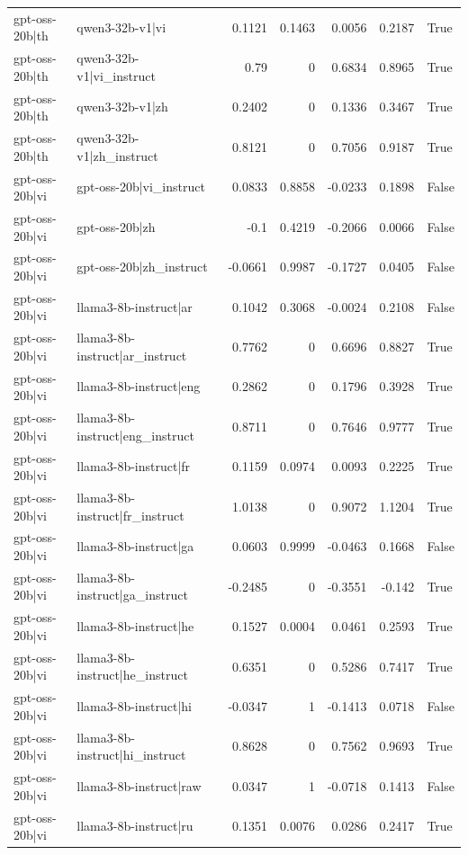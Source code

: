 \begin{table}
\begin{tabular}{l l r r r r l}
gpt-oss-20b|th & qwen3-32b-v1|vi & 0.1121 & 0.1463 & 0.0056 & 0.2187 & True \\
gpt-oss-20b|th & qwen3-32b-v1|vi_instruct & 0.79 & 0 & 0.6834 & 0.8965 & True \\
gpt-oss-20b|th & qwen3-32b-v1|zh & 0.2402 & 0 & 0.1336 & 0.3467 & True \\
gpt-oss-20b|th & qwen3-32b-v1|zh_instruct & 0.8121 & 0 & 0.7056 & 0.9187 & True \\
gpt-oss-20b|vi & gpt-oss-20b|vi_instruct & 0.0833 & 0.8858 & -0.0233 & 0.1898 & False \\
gpt-oss-20b|vi & gpt-oss-20b|zh & -0.1 & 0.4219 & -0.2066 & 0.0066 & False \\
gpt-oss-20b|vi & gpt-oss-20b|zh_instruct & -0.0661 & 0.9987 & -0.1727 & 0.0405 & False \\
gpt-oss-20b|vi & llama3-8b-instruct|ar & 0.1042 & 0.3068 & -0.0024 & 0.2108 & False \\
gpt-oss-20b|vi & llama3-8b-instruct|ar_instruct & 0.7762 & 0 & 0.6696 & 0.8827 & True \\
gpt-oss-20b|vi & llama3-8b-instruct|eng & 0.2862 & 0 & 0.1796 & 0.3928 & True \\
gpt-oss-20b|vi & llama3-8b-instruct|eng_instruct & 0.8711 & 0 & 0.7646 & 0.9777 & True \\
gpt-oss-20b|vi & llama3-8b-instruct|fr & 0.1159 & 0.0974 & 0.0093 & 0.2225 & True \\
gpt-oss-20b|vi & llama3-8b-instruct|fr_instruct & 1.0138 & 0 & 0.9072 & 1.1204 & True \\
gpt-oss-20b|vi & llama3-8b-instruct|ga & 0.0603 & 0.9999 & -0.0463 & 0.1668 & False \\
gpt-oss-20b|vi & llama3-8b-instruct|ga_instruct & -0.2485 & 0 & -0.3551 & -0.142 & True \\
gpt-oss-20b|vi & llama3-8b-instruct|he & 0.1527 & 0.0004 & 0.0461 & 0.2593 & True \\
gpt-oss-20b|vi & llama3-8b-instruct|he_instruct & 0.6351 & 0 & 0.5286 & 0.7417 & True \\
gpt-oss-20b|vi & llama3-8b-instruct|hi & -0.0347 & 1 & -0.1413 & 0.0718 & False \\
gpt-oss-20b|vi & llama3-8b-instruct|hi_instruct & 0.8628 & 0 & 0.7562 & 0.9693 & True \\
gpt-oss-20b|vi & llama3-8b-instruct|raw & 0.0347 & 1 & -0.0718 & 0.1413 & False \\
gpt-oss-20b|vi & llama3-8b-instruct|ru & 0.1351 & 0.0076 & 0.0286 & 0.2417 & True \\

\end{tabular}
\end{table}
